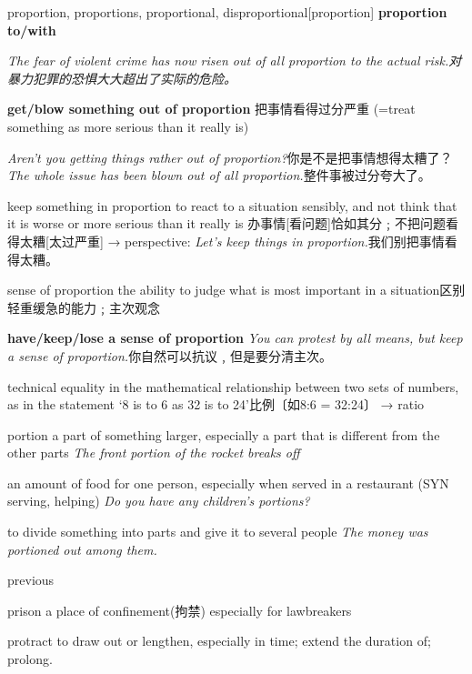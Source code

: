 \begin{word}{proportion, proportions, proportional, disproportional}[proportion]
\textbf{proportion to/with}

\textit{The fear of violent crime has now risen out of all proportion to the actual risk.对暴力犯罪的恐惧大大超出了实际的危险。}

\textbf{get/blow something out of proportion} 把事情看得过分严重
(=treat something as more serious than it really is)

\textit{Aren’t you getting things rather out of proportion?}你是不是把事情想得太糟了？
\textit{The whole issue has been blown out of all proportion.}整件事被过分夸大了。

keep something in proportion to react to a situation sensibly, and not think that it is worse or more serious than it really is 办事情[看问题]恰如其分﹔不把问题看得太糟[太过严重] → perspective:
\textit{Let’s keep things in proportion.}我们别把事情看得太糟。

sense of proportion the ability to judge what is most important in a situation区别轻重缓急的能力﹔主次观念

\textbf{have/keep/lose a sense of proportion}
\textit{You can protest by all means, but keep a sense of proportion.}你自然可以抗议﹐但是要分清主次。

technical equality in the mathematical relationship between two sets of numbers, as in the statement ‘8 is to 6 as 32 is to 24’比例〔如8:6 = 32:24〕 → ratio


\end{word}



\begin{word}{portion}
    a part of something larger, especially a part that is different from the other parts
    \textit{The front portion of the rocket breaks off}

    an amount of food for one person, especially when served in a restaurant (SYN  serving, helping)
    \textit{Do you have any children’s portions?}

    to divide something into parts and give it to several people
    \textit{The money was portioned out among them.}
\end{word}

\begin{word}{previous}
\end{word}

\begin{word}{prison}
    a place of confinement(拘禁) especially for lawbreakers
\end{word}

\begin{word}{protract}
    to draw out or lengthen, especially in time; extend the duration of; prolong.
\end{word}

